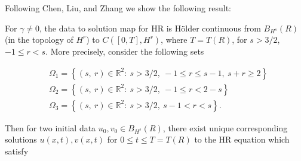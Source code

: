 \documentclass{beamer}
\numberwithin{equation}{section}
\newcommand{\rr}{\mathbb{R}}
\begin{document}
\begin{frame}
Following Chen, Liu, and Zhang \cite{Chen:2011fk} we show the
following result:


\begin{theorem}

\label{thm:main-thm}
For $\gamma \neq 0$, the
data to solution map for HR is H\"older continuous from $B_{H^{s}}(R)$ (in
the topology of $H^{r}$) to $C([0, T], H^{r})$, where $T = T(R)$, for $s >
3/2$, $-1 \le r < s$. More
precisely, consider the following sets 

  
  \begin{equation*}
  \begin{split}
      & \Omega_{1} = \left\{ (s, \ r) \in \rr^{2}:
     \ s>3/2, \ -1 \le r \le s-1, \ s + r \ge 2  \right\}
    \\
    & \Omega_{2} = \left\{ (s, \ r) \in \rr^{2}:
     \ s>3/2, \ -1 \le r < 2-s \right\}
    \\
    & \Omega_{3} = \left\{ (s, \ r) \in \rr^{2}:
    \  s>3/2, \  s-1 < r < s  \right\}.
    \end{split}
\end{equation*}
\end{theorem}
\end{frame}
\begin{frame}
\begin{theorem}
\begin{center}
\end{center}


Then for two initial data $u_{0}, v_{0} \in B_{H^{s}}(R)$, there exist unique
corresponding solutions $u(x,t), v(x,t)$ for $0 \le t \le T= T(R)$ to the
HR equation which satisfy 
\end{theorem}
\end{frame}
\end{document}
